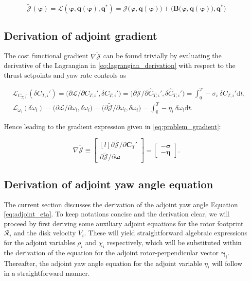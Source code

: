 \documentclass[energies,article,submit,moreauthors,latex,10pt,a4paper]{mdpi}
\newcommand{\bs}[1]{\boldsymbol{#1}}
\newcommand{\dt}{\text{d}t}
\newcommand{\Tint}{\int_{0}^{T}}
\newcommand{\ctihat}{\widehat{C}_{T,i}'}
\newcommand{\cti}{C_{T,i}'}
\newcommand{\R}{\mathscr{R}}
\newcommand{\J}{\mathscr{J}}
\newcommand{\Jtilde}{\tilde{\mathscr{J}}}
\newcommand{\Lagr}{\mathscr{L}}
\newcommand{\innerproduct}[2]{\bigg( #1, #2 \bigg)}
\newcommand{\innerproductsmall}[2]{\big( #1, #2 \big)}
\begin{document}
\begin{equation}
\Jtilde(\bs{\varphi}) = \Lagr(\bs{\varphi}, \bs{q}(\bs{\varphi}), \bs{q}^*) = \J\big(\bs{\varphi}, \bs{q}(\bs{\varphi})\big) + \innerproduct{\bs{B}\big(\bs{\varphi}, \bs{q}(\bs{\varphi})\big)}{\bs{q}^*}
\end{equation}


\subsection{Derivation of adjoint gradient}\label{sec:app_adj_grad}
\noindent The cost functional gradient $\nabla \Jtilde$ can be found trivially by evaluating the derivative of the Lagrangian in \eqref{eq:lagrangian_derivation} with respect to the thrust setpoints and yaw rate controls as 

\begin{align}
&\Lagr_{\cti}(\delta\cti) = \innerproductsmall{\partial \Lagr /\partial \cti}{\delta \cti} = \big(\partial \Jtilde/\partial \ctihat, \delta \ctihat \big)= \Tint -\sigma_i \ \delta \cti \dt, \label{eq:app_adjoint_grad_sigma}\\
&\Lagr_{\omega_i}(\delta\omega_i) = \innerproductsmall{\partial \Lagr /\partial \omega_i}{\delta \omega_i} =\big( \partial \Jtilde/\partial \omega_i, \delta \omega_i \big)= \Tint -\eta_i \ \delta \omega_i \dt. \label{eq:app_adjoint_grad_eta}
\end{align}

\noindent Hence leading to the gradient expression given in \eqref{eq:problem_gradient}:

\begin{equation}
\nabla \Jtilde \equiv 
\begin{bmatrix*}[l]
\partial \Jtilde / \partial \bs{C}_T' \\
\partial \Jtilde / \partial \bs{\omega} 
\end{bmatrix*} = 
\begin{bmatrix}
- \bs{\sigma}\\
- \bs{\eta}
\end{bmatrix}.
\end{equation}


\subsection{Derivation of adjoint yaw angle equation}\label{sec:app_adj_eta}
\noindent The current section discusses the derivation of the adjoint yaw angle Equation \eqref{eq:adjoint_eta}. To keep notations concise and the derivation clear, we will proceed by first deriving some auxiliary adjoint equations for the rotor footprint $\R_i$ and the disk velocity $V_i$. These will yield straightforward algebraic expressions for the adjoint variables $\rho_i$ and $\chi_i$ respectively, which will be substituted within the derivation of the equation for the adjoint rotor-perpendicular vector $\bs{\gamma}_i$. Thereafter, the adjoint yaw angle equation for the adjoint variable $\eta_i$ will follow in a straightforward manner.
\end{document}

